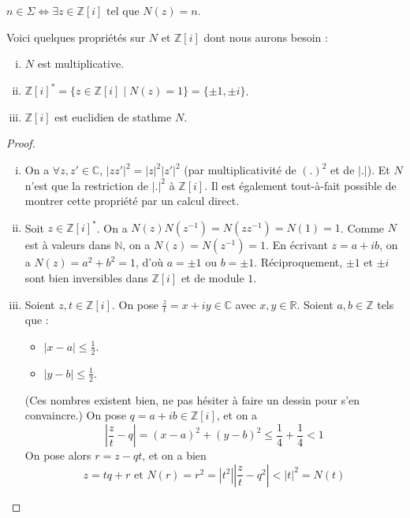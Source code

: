 	\begin{remark}
		\label{theoreme-des-deux-carres-fermat-2}
		$n \in \Sigma \iff \exists z \in \mathbb{Z}[i] \text{ tel que } N(z)=n$.
	\end{remark}

	\begin{lemma}
		\label{theoreme-des-deux-carres-fermat-3}
		Voici quelques propriétés sur $N$ et $\mathbb{Z}[i]$ dont nous aurons besoin :
		\begin{enumerate}[(i)]
			\item $N$ est multiplicative.
			\item $\mathbb{Z}[i]^* = \{ z \in \mathbb{Z}[i] \mid N(z) = 1 \} = \{ \pm 1, \pm i \}$.
			\item $\mathbb{Z}[i]$ est euclidien de stathme $N$.
		\end{enumerate}
	\end{lemma}

	\begin{proof}
		\begin{enumerate}[(i)]
			\item On a $\forall z, z' \in \mathbb{C}$, $|zz'|^2 = |z|^2 |z'|^2$ (par multiplicativité de $(.)^2$ et de $|.|$). Et $N$ n'est que la restriction de $|.|^2$ à $\mathbb{Z}[i]$. Il est également tout-à-fait possible de montrer cette propriété par un calcul direct.
			\item Soit $z \in \mathbb{Z}[i]^*$. On a $N(z)N(z^{-1}) = N(zz^{-1}) = N(1) = 1$. Comme $N$ est à valeurs dans $\mathbb{N}$, on a $N(z) = N(z^{-1}) = 1$. En écrivant $z = a+ib$, on a $N(z) = a^2 + b^2 = 1$, d'où $a = \pm 1$ ou $b = \pm 1$. Réciproquement, $\pm 1$ et $\pm i$ sont bien inversibles dans $\mathbb{Z}[i]$ et de module $1$.
			\item Soient $z, t \in \mathbb{Z}[i]$. On pose $\frac{z}{t} = x + iy \in \mathbb{C}$ avec $x, y \in \mathbb{R}$. Soient $a, b \in \mathbb{Z}$ tels que :
			\begin{itemize}
				\item $|x-a| \leq \frac{1}{2}$.
				\item $|y-b| \leq \frac{1}{2}$.
			\end{itemize}
			(Ces nombres existent bien, ne pas hésiter à faire un dessin pour s'en convaincre.) On pose $q = a+ib \in \mathbb{Z}[i]$, et on a
			\[ \left| \frac{z}{t} - q \right| = (x-a)^2 + (y-b)^2 \leq \frac{1}{4} + \frac{1}{4} < 1 \]
			On pose alors $r = z-qt$, et on a bien
			\[ z = tq+r \text{ et } N(r) = r^2 = |t^2| \left| \frac{z}{t} - q^2 \right| < |t|^2 = N(t) \]
		\end{enumerate}
	\end{proof}

